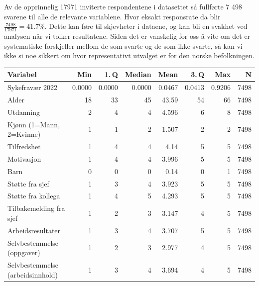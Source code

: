 \documentclass[
  12pt,
  a4paper,
  DIV=11,
  numbers=noendperiod]{scrartcl}
\begin{document}
Av de opprinnelig 17971 inviterte respondentene i datasettet så
fullførte 7 498 svarene til alle de relevante variablene. Hvor eksakt
responsrate da blir \(\frac{7498}{17971} = 41.7\%\). Dette kan føre til
skjevheter i dataene, og kan bli en svakhet ved analysen når vi tolker
resultatene. Siden det er vanskelig for oss å vite om det er
systematiske forskjeller mellom de som svarte og de som ikke svarte, så
kan vi ikke si noe sikkert om hvor representativt utvalget er for den
norske befolkningen.

\begin{table}[ht]
\centering
\begin{tabular}{lrrrrrrr}
\toprule
Variabel                               & Min   & 1.\,Q  & Median & Mean   & 3.\,Q  & Max  & N    \\
\midrule
Sykefravær 2022                        & 0.0000 & 0.0000 & 0.0000 & 0.0467 & 0.0413 & 0.9206 & 7498 \\
Alder                                  & 18     & 33     & 45     & 43.59  & 54     & 66     & 7498 \\
Utdanning                              & 2      & 4      & 4      & 4.596  & 6      & 8      & 7498 \\
Kjønn (1=Mann, 2=Kvinne)               & 1      & 1      & 2      & 1.507  & 2      & 2      & 7498 \\
Tilfredshet                            & 1      & 4      & 4      & 4.14   & 5      & 5      & 7498 \\
Motivasjon                             & 1      & 4      & 4      & 3.996  & 5      & 5      & 7498 \\
Barn                                   & 0      & 0      & 0      & 0.14   & 0      & 1      & 7498 \\
Støtte fra sjef                        & 1      & 3      & 4      & 3.923  & 5      & 5      & 7498 \\
Støtte fra kollega                     & 1      & 4      & 5      & 4.293  & 5      & 5      & 7498 \\
Tilbakemelding fra sjef                & 1      & 2      & 3      & 3.147  & 4      & 5      & 7498 \\
Arbeidsresultater                      & 1      & 3      & 4      & 3.707  & 5      & 5      & 7498 \\
Selvbestemmelse (oppgaver)             & 1      & 2      & 3      & 2.977  & 4      & 5      & 7498 \\
Selvbestemmelse (arbeidsinnhold)       & 1      & 3      & 4      & 3.694  & 4      & 5      & 7498 \\

\end{tabular}
\end{table}
\end{document}
